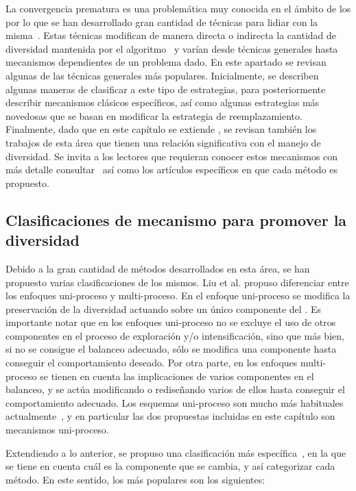 La convergencia prematura es una problemática muy conocida en el ámbito de los \EAS{} por lo que se han desarrollado gran cantidad de técnicas 
para lidiar con la misma~\cite{pandey2014comparative}.
%
Estas técnicas modifican de manera directa o indirecta la cantidad de diversidad mantenida por el algoritmo~\cite{Joel:Crepinsek}
y varían desde técnicas generales hasta mecanismos dependientes de un problema dado.
%
En este apartado se revisan algunas de las técnicas generales más populares.
%
Inicialmente, se describen algunas maneras de clasificar a este tipo de estrategias, para posteriormente
describir mecanismos clásicos específicos, así como algunas estrategias más novedosas que se basan en modificar
la estrategia de reemplazamiento.
%
Finalmente, dado que en este capítulo se extiende \DE{}, se revisan también los trabajos de esta área que tienen una relación
significativa con el manejo de diversidad.
%
Se invita a los lectores que requieran conocer estos mecanismos con más detalle consultar~\cite{Joel:Crepinsek} así como los artículos
específicos en que cada método es propuesto.

\subsection{Clasificaciones de mecanismo para promover la diversidad}

Debido a la gran cantidad de métodos desarrollados en esta área, se han propuesto varias clasificaciones de los mismos.
%
Liu et al.\cite{liu2009explore} propuso diferenciar entre los enfoques uni-proceso y multi-proceso.
%
En el enfoque uni-proceso se modifica la preservación de la diversidad actuando sobre un único componente del \EA{}. 
%
Es importante notar que en los enfoques uni-proceso no se excluye el uso de otros componentes en el proceso de exploración y/o intensificación, 
sino que más bien, si no se consigue el balanceo adecuado, sólo se modifica una componente hasta conseguir el comportamiento deseado.
%
Por otra parte, en los enfoques multi-proceso se tienen en cuenta las implicaciones de varios componentes en el balanceo, y se actúa modificando o rediseñando varios de ellos
hasta conseguir el comportamiento adecuado.
%
Los esquemas uni-proceso son mucho más habituales actualmente~\cite{Crepinsek:13}, y en particular las dos propuestas incluidas en este capítulo son mecanismos
uni-proceso.

Extendiendo a lo anterior, se propuso una clasificación más específica~\cite{Crepinsek:13}, en la que se tiene en cuenta cuál es la componente 
que se cambia, y así categorizar cada método.
%
En este sentido, los más populares son los siguientes:

